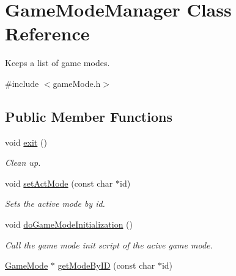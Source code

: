 \hypertarget{classGameModeManager}{
\section{\-Game\-Mode\-Manager \-Class \-Reference}
\label{d0/dab/classGameModeManager}
}


\-Keeps a list of game modes.  




{\ttfamily \#include $<$game\-Mode.\-h$>$}

\subsection*{\-Public \-Member \-Functions}
\begin{DoxyCompactItemize}
\item 
\hypertarget{classGameModeManager_aeb7a41c22689eb427d3d2367727917a1}{
void \hyperlink{classGameModeManager_aeb7a41c22689eb427d3d2367727917a1}{exit} ()}
\label{d0/dab/classGameModeManager_aeb7a41c22689eb427d3d2367727917a1}

\begin{DoxyCompactList}\small\item\em \-Clean up. \end{DoxyCompactList}\item 
\hypertarget{classGameModeManager_a302d93110b00421b6021b2d97468c654}{
void \hyperlink{classGameModeManager_a302d93110b00421b6021b2d97468c654}{set\-Act\-Mode} (const char $\ast$id)}
\label{d0/dab/classGameModeManager_a302d93110b00421b6021b2d97468c654}

\begin{DoxyCompactList}\small\item\em \-Sets the active mode by id. \end{DoxyCompactList}\item 
\hypertarget{classGameModeManager_a5988386246dd3a8c9e42f914c8067343}{
void \hyperlink{classGameModeManager_a5988386246dd3a8c9e42f914c8067343}{do\-Game\-Mode\-Initialization} ()}
\label{d0/dab/classGameModeManager_a5988386246dd3a8c9e42f914c8067343}

\begin{DoxyCompactList}\small\item\em \-Call the game mode init script of the acive game mode. \end{DoxyCompactList}\item 
\hypertarget{classGameModeManager_abbef1e92f3fec7badb5050dd9c733f83}{
\hyperlink{classGameMode}{\-Game\-Mode} $\ast$ \hyperlink{classGameModeManager_abbef1e92f3fec7badb5050dd9c733f83}{get\-Mode\-By\-I\-D} (const char $\ast$id)}
\label{d0/dab/classGameModeManager_abbef1e92f3fec7badb5050dd9c733f83}


\end{DoxyCompactItemize}
